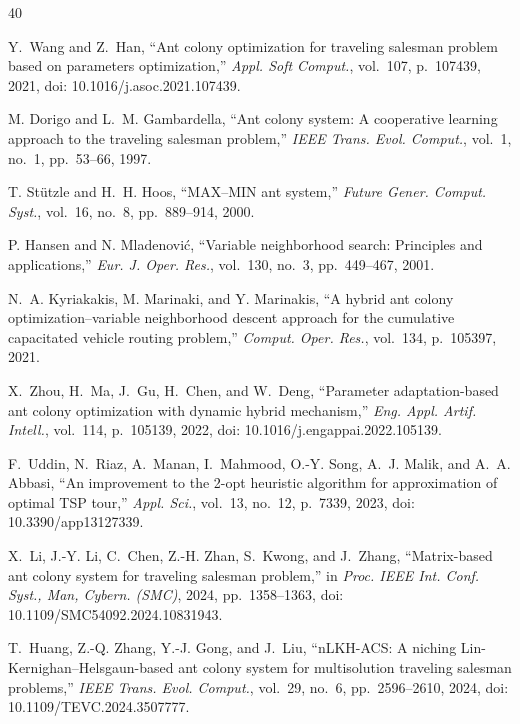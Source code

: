 \documentclass[lettersize,journal]{IEEEtran}
\begin{document}
\begin{thebibliography}{40}

Y.~Wang and Z.~Han, ``Ant colony optimization for traveling salesman problem based on parameters optimization,'' \textit{Appl. Soft Comput.}, vol.~107, p.~107439, 2021, doi: 10.1016/j.asoc.2021.107439.



M. Dorigo and L.~M. Gambardella, ``Ant colony system: A cooperative learning approach to the traveling salesman problem,'' \textit{IEEE Trans. Evol. Comput.}, vol.~1, no.~1, pp.~53--66, 1997.



T. St\"utzle and H.~H. Hoos, ``MAX--MIN ant system,'' \textit{Future Gener. Comput. Syst.}, vol.~16, no.~8, pp.~889--914, 2000.



P. Hansen and N. Mladenovi\'c, ``Variable neighborhood search: Principles and applications,'' \textit{Eur. J. Oper. Res.}, vol.~130, no.~3, pp.~449--467, 2001.



N.~A. Kyriakakis, M. Marinaki, and Y. Marinakis, ``A hybrid ant colony optimization--variable neighborhood descent approach for the cumulative capacitated vehicle routing problem,'' \textit{Comput. Oper. Res.}, vol.~134, p.~105397, 2021.



X.~Zhou, H.~Ma, J.~Gu, H.~Chen, and W.~Deng, ``Parameter adaptation-based ant colony optimization with dynamic hybrid mechanism,'' \textit{Eng. Appl. Artif. Intell.}, vol.~114, p.~105139, 2022, doi: 10.1016/j.engappai.2022.105139.



F.~Uddin, N.~Riaz, A.~Manan, I.~Mahmood, O.-Y. Song, A.~J. Malik, and A.~A. Abbasi, ``An improvement to the 2-opt heuristic algorithm for approximation of optimal TSP tour,'' \textit{Appl. Sci.}, vol.~13, no.~12, p.~7339, 2023, doi: 10.3390/app13127339.



X.~Li, J.-Y. Li, C.~Chen, Z.-H. Zhan, S.~Kwong, and J.~Zhang, ``Matrix-based ant colony system for traveling salesman problem,'' in \textit{Proc. IEEE Int. Conf. Syst., Man, Cybern. (SMC)}, 2024, pp.~1358--1363, doi: 10.1109/SMC54092.2024.10831943.



T.~Huang, Z.-Q. Zhang, Y.-J. Gong, and J.~Liu, ``nLKH-ACS: A niching Lin-Kernighan--Helsgaun-based ant colony system for multisolution traveling salesman problems,'' \textit{IEEE Trans. Evol. Comput.}, vol.~29, no.~6, pp.~2596--2610, 2024, doi: 10.1109/TEVC.2024.3507777.



\end{thebibliography}
\end{document}
